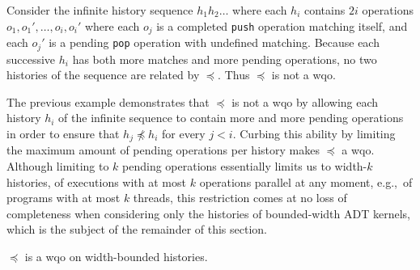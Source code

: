 \begin{example}

  Consider the infinite history sequence $h_1 h_2 \ldots$ where each $h_i$
  contains $2i$ operations $o_1, o_1', \ldots, o_i, o_i'$ where each $o_j$ is a
  completed {\tt push} operation matching itself, and each $o_j'$ is a pending
  {\tt pop} operation with undefined matching. Because each successive $h_i$
  has both more matches and more pending operations, no two histories of the
  sequence are related by $\preceq$. Thus $\preceq$ is not a wqo.

\end{example}

The previous example demonstrates that $\preceq$ is not a wqo by allowing each
history $h_i$ of the infinite sequence to contain more and more pending
operations in order to ensure that $h_j \not\preceq h_i$ for every $j < i$.
Curbing this ability by limiting the maximum amount of pending operations per
history makes $\preceq$ a wqo. Although limiting to $k$ pending operations
essentially limits us to width-$k$ histories, of executions with at most $k$
operations parallel at any moment, e.g.,~of programs with at most $k$ threads,
this restriction comes at no loss of completeness when considering only the
histories of bounded-width ADT kernels, which is the subject of the remainder
of this section.

\begin{lemma}

  $\preceq$ is a wqo on width-bounded histories.

\end{lemma}

